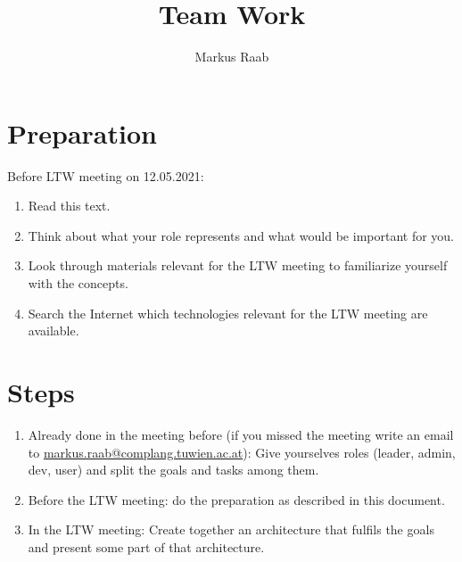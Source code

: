 



\setcounter{chapter}{1} %




\title{Team Work}
\author{Markus Raab}




\maketitle
\doclicenseThis

\section{Preparation}

Before LTW meeting on 12.05.2021: %

\begin{enumerate}
	\item Read this text.
	\item Think about what your role represents and what would be important for you.
	\item Look through materials relevant for the LTW meeting to familiarize yourself with the concepts.
	\item Search the Internet which technologies relevant for the LTW meeting are available.
\end{enumerate}

\section{Steps}

\begin{enumerate}
	\item Already done in the meeting before (if you missed the meeting write an email to \url{markus.raab@complang.tuwien.ac.at}):
	Give yourselves roles (leader, admin, dev, user) and split the goals and tasks among them.
	\item Before the LTW meeting: do the preparation as described in this document.
	\item In the LTW meeting: Create together an architecture that fulfils the goals and present some part of that architecture.
\end{enumerate}

